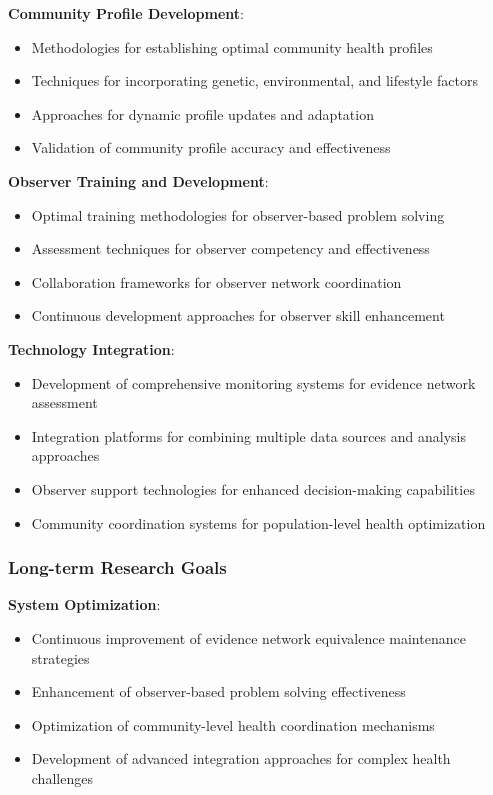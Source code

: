 \documentclass[12pt,a4paper]{article}
\begin{document}
\textbf{Community Profile Development}:
\begin{itemize}
\item Methodologies for establishing optimal community health profiles
\item Techniques for incorporating genetic, environmental, and lifestyle factors
\item Approaches for dynamic profile updates and adaptation
\item Validation of community profile accuracy and effectiveness
\end{itemize}

\textbf{Observer Training and Development}:
\begin{itemize}
\item Optimal training methodologies for observer-based problem solving
\item Assessment techniques for observer competency and effectiveness
\item Collaboration frameworks for observer network coordination
\item Continuous development approaches for observer skill enhancement
\end{itemize}

\textbf{Technology Integration}:
\begin{itemize}
\item Development of comprehensive monitoring systems for evidence network assessment
\item Integration platforms for combining multiple data sources and analysis approaches
\item Observer support technologies for enhanced decision-making capabilities
\item Community coordination systems for population-level health optimization
\end{itemize}

\subsubsection{Long-term Research Goals}

\textbf{System Optimization}:
\begin{itemize}
\item Continuous improvement of evidence network equivalence maintenance strategies
\item Enhancement of observer-based problem solving effectiveness
\item Optimization of community-level health coordination mechanisms
\item Development of advanced integration approaches for complex health challenges
\end{itemize}
\end{document}
